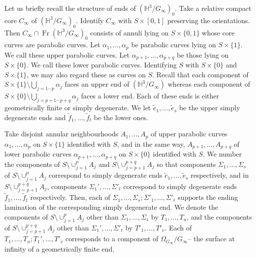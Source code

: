 \documentclass{amsart}
\theoremstyle{definition}
\newcommand{\Fr}{\operatorname{Fr}}
\newcommand\HHH{{\mathbb H}}
\begin{document}
Let us briefly recall  the structure of ends of $(\HHH^3/G_\infty)_0$.
Take a relative compact core $C_\infty$ of $(\HHH^3/G_\infty)_0$.
Identify $C_\infty$ with $S \times [0,1]$ preserving the orientations.
Then $C_\infty \cap \Fr (\HHH^3/G_\infty)_0$ consists of annuli lying on $S \times \{0,1\}$ whose core curves are parabolic curves.
Let $\alpha_1, \dots , \alpha_p$ be parabolic curves  lying on $S \times \{1\}$. We call these upper parabolic curves. Let  $\alpha_{p+1}, \dots , \alpha_{p+q}$ be those lying on $S \times \{0\}$. We call these lower parabolic curves.
Identifying $S$ with $S \times \{0\}$ and $S \times \{1\}$, we may also regard these as  curves on $S$.
Recall that each component of $S \times\{1\} \setminus \bigcup_{j=1 \cdots p} \alpha_j$ faces  an upper end of $(\HHH^3/G_\infty)$ whereas each component of $S \times \{0\} \setminus  \bigcup_{j=p+1 \cdots p+q} \alpha_j$ faces a lower end.
Each of these ends is either geometrically finite or simply degenerate.
We let $\tilde e_1, \dots ,\tilde e_s$ be the upper simply degenerate ends and $\tilde f_1, \dots, \tilde f_t$ be the lower ones.


Take disjoint annular neighbourhoods $A_1, \dots , A_p$ of upper parabolic curves $\alpha_1, \dots , \alpha_p$ on $S \times \{1\}$ identified with $S$, and in the same way,  $A_{p+1}, \dots, A_{p+q}$ of lower parabolic curves $\alpha_{p+1}, \dots, \alpha_{p+q}$ on $S \times \{0\}$ identified with $S$.
We number the components of $S \setminus \cup_{j=1}^p A_j$  and $S \setminus \cup_{j=p+1}^{p+q} A_j$ so that components $\Sigma_1, \dots , \Sigma_s$ of $S \setminus \cup_{j=1}^p A_j$ correspond to simply degenerate ends $\tilde e_1, \dots , \tilde e_s$ respectively, and in $S \setminus \cup_{j=p+1}^{p+q} A_j$,   components $\Sigma_1', \dots , \Sigma'_t$ correspond to simply degenerate ends $\tilde f_1, \dots , \tilde f_t$ respectively. Then,
each  of $\Sigma_1, \dots , \Sigma_s; \Sigma'_1, \dots , \Sigma'_t$ supports the ending lamination of the corresponding simply degenerate end.
We denote the components of $S \setminus \cup_{j=1}^p A_j$ other than $\Sigma_1, \dots , \Sigma_s$ by $T_1, \dots , T_u$, and the components of $S \setminus \cup_{j=p+1}^{p+q} A_j$ other than $\Sigma_1' , \dots, \Sigma'_t$ by $T'_1, \dots ,T'_v$.
Each of $T_1, \dots , T_u; T_1', \dots, T'_v$ corresponds to a component of $\Omega_{G_\infty}/G_\infty$-- the surface at infinity of a geometrically finite end.
\end{document}
